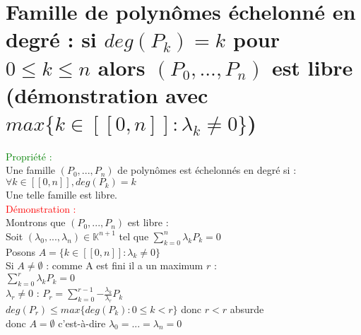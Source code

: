 \documentclass{article}
\begin{document}
\section{Famille de polynômes échelonné en degré : si $deg(P_k)=k$ pour $0 \leq k \leq n$ alors $(P_0,...,P_n)$ est libre (démonstration avec $max \lbrace k \in [[0,n]] : \lambda_k \neq 0 \rbrace$)}
\textcolor{green}{Propriété :} \\ 
Une famille $(P_0,...,P_n)$ de polynômes est échelonnés en degré si : \\ 
$\forall k \in [[0,n]], deg(P_k)=k$ \\ 
Une telle famille est libre. \\ 
\textcolor{red}{Démonstration :} \\ 
Montrons que  $(P_0,...,P_n)$ est libre : \\ 
Soit $(\lambda_0,...,\lambda_n) \in \mathbb{K}^{n+1}$ tel que $\sum_{k=0}^n \lambda_k P_k=0$ \\ 
Posons $A=\lbrace k \in [[0,n]] : \lambda_k \neq 0 \rbrace$ \\ 
Si $A \neq \emptyset$ : comme A est fini il a un maximum $r$ : \\ 
$\sum_{k=0}^{r}\lambda_kP_k=0$ \\ 
$\lambda_r\neq 0$ : $P_r= \sum^{r-1}_{k=0}{-\frac{\lambda_k}{\lambda_r}P_k}$ \\ 
$deg(P_r) \leq max \lbrace deg(P_k) : 0 \leq k < r \rbrace$ donc $r<r$ absurde \\ 
donc $A= \emptyset$ c'est-à-dire $\lambda_0=...=\lambda_n=0$
\end{document}
